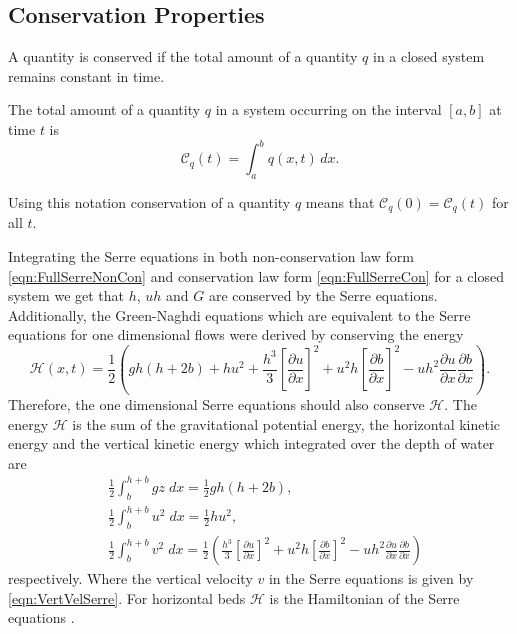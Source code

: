 \subsection{Conservation Properties}
A quantity is conserved if the total amount of a quantity $q$ in a closed system remains constant in time.
\begin{defn}
	\label{defn:TotalAmmountab}
	The total amount of a quantity $q$ in a system occurring on the interval $[a,b]$ at time $t$ is
	\begin{equation*}
	\mathcal{C}_q(t) = \int_{a}^{b} q(x,t)\, dx.
	\end{equation*}
\end{defn}
Using this notation conservation of a quantity $q$ means that $\mathcal{C}_{q}(0) = \mathcal{C}_{q}(t)$ for all $t$. 

Integrating the Serre equations in both non-conservation law form \eqref{eqn:FullSerreNonCon} and conservation law form \eqref{eqn:FullSerreCon} for a closed system we get that $h$, $uh$ and $G$ are conserved by the Serre equations. Additionally, the Green-Naghdi equations \cite{Green-Naghdi-1976-237} which are equivalent to the Serre equations for one dimensional flows were derived by conserving the energy
\begin{equation*}
	\mathcal{H}(x,t) = \frac{1}{2} \left( gh\left(h + 2b\right) + hu^2  + \frac{h^3}{3} \left[\frac{\partial u}{\partial x}\right]^2 + u^2h\left[\frac{\partial b}{\partial x}\right]^2 - uh^2 \frac{\partial u}{\partial x} \frac{\partial b}{\partial x}  \right).
	\label{eqn:Hamildef}
\end{equation*}
Therefore, the one dimensional Serre equations should also conserve $\mathcal{H}$. The energy $\mathcal{H}$ is the sum of the gravitational potential energy, the horizontal kinetic energy and the vertical kinetic energy which integrated over the depth of water are
\begin{align*}
& \frac{1}{2}\int_{b}^{h +b} gz \; dx = \frac{1}{2}gh\left(h + 2b\right), \\
& \frac{1}{2}\int_{b}^{h +b} u^2 \; dx = \frac{1}{2}hu^2, \\
& \frac{1}{2}\int_{b}^{h +b} v^2 \; dx = \frac{1}{2} \left(\frac{h^3}{3} \left[\frac{\partial u}{\partial x}\right]^2 + u^2h\left[\frac{\partial b}{\partial x}\right]^2 - uh^2 \frac{\partial u}{\partial x} \frac{\partial b}{\partial x} \right)
\end{align*}
respectively. Where the vertical velocity $v$ in the Serre equations is given by \eqref{eqn:VertVelSerre}. For horizontal beds $\mathcal{H}$ is the Hamiltonian of the Serre equations \cite{Li-Y-2002}.
 
